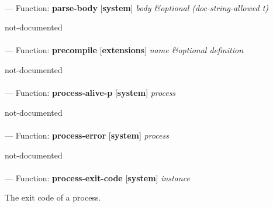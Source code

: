 \paragraph{}
\label{SYSTEM:PARSE-BODY}
--- Function: \textbf{parse-body} [\textbf{system}] \textit{body \&optional (doc-string-allowed t)}

\begin{adjustwidth}{5em}{5em}
not-documented
\end{adjustwidth}

\paragraph{}
\label{EXTENSIONS:PRECOMPILE}
--- Function: \textbf{precompile} [\textbf{extensions}] \textit{name \&optional definition}

\begin{adjustwidth}{5em}{5em}
not-documented
\end{adjustwidth}

\paragraph{}
\label{SYSTEM:PROCESS-ALIVE-P}
--- Function: \textbf{process-alive-p} [\textbf{system}] \textit{process}

\begin{adjustwidth}{5em}{5em}
not-documented
\end{adjustwidth}

\paragraph{}
\label{SYSTEM:PROCESS-ERROR}
--- Function: \textbf{process-error} [\textbf{system}] \textit{process}

\begin{adjustwidth}{5em}{5em}
not-documented
\end{adjustwidth}

\paragraph{}
\label{SYSTEM:PROCESS-EXIT-CODE}
--- Function: \textbf{process-exit-code} [\textbf{system}] \textit{instance}

\begin{adjustwidth}{5em}{5em}
The exit code of a process.
\end{adjustwidth}

